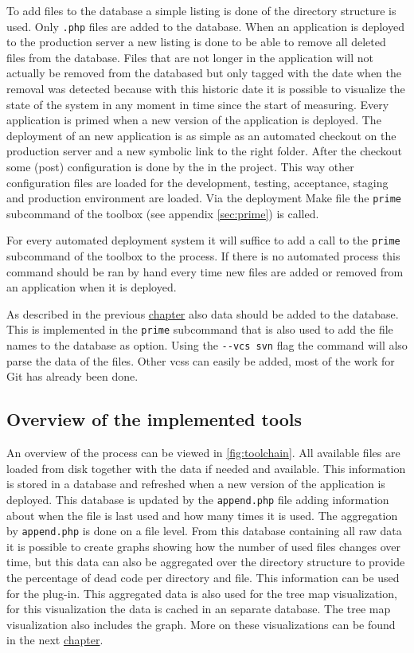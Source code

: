 To add files to the database a simple listing is done of the directory structure is used. Only \verb|.php| files are added to the database. When an application is deployed to the production server a new listing is done to be able to remove all deleted files from the database. Files that are not longer in the application will not actually be removed from the databased but only tagged with the date when the removal was detected because with this historic date it is possible to visualize the state of the system in any moment in time since the start of measuring. Every application is primed when a new version of the application is deployed. The deployment of an new application is as simple as an automated \svn checkout on the production server and a new symbolic link to the right folder. After the checkout some (post) configuration is done by the  in the project. This way other configuration files are loaded for the development, testing, acceptance, staging and production environment are loaded. Via the deployment  Make file the \verb|prime| subcommand of the toolbox (see appendix \ref{sec:prime}) is called.

For every automated deployment system it will suffice to add a call to the \verb|prime| subcommand of the toolbox to the process. If there is no automated process this command should be ran by hand every time new files are added or removed from an application when it is deployed.

As described in the previous \hyperref[ch:identification]{chapter} also \vcs data should be added to the database. This is implemented in the \verb|prime| subcommand that is also used to add the file names to the database as option. Using the \verb|--vcs svn| flag the command will also parse the \svn data of the files. Other \glspl{vcs} can easily be added, most of the work for Git has already been done.

\subsection*{Overview of the implemented tools}

An overview of the process can be viewed in \autoref{fig:toolchain}. All available files are loaded from disk together with the \vcs data if needed and available. This information is stored in a database and refreshed when a new version of the application is deployed. This database is updated by the \verb|append.php| file adding information about when the file is last used and how many times it is used. The aggregation by \verb|append.php| is done on a file level. From this database containing all raw data it is possible to create graphs showing how the number of used files changes over time, but this data can also be aggregated over the directory structure to provide the percentage of dead code per directory and file. This information can be used for the plug-in. This aggregated data is also used for the tree map visualization, for this visualization the data is cached in an separate database. The tree map visualization also includes the graph. More on these visualizations can be found in the next \hyperref[ch:visualization]{chapter}.